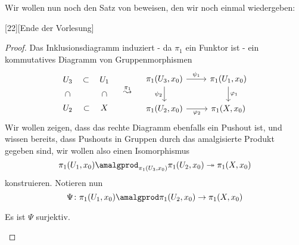Wir wollen nun noch den Satz von  beweisen, den wir noch einmal wiedergeben:

[22]{}[Ende der Vorlesung]


\begin{proof}
    Das Inklusionsdiagramm induziert - da $\pi_1$ ein Funktor ist - ein kommutatives Diagramm von Gruppenmorphismen
    \[
        \begin{tikzcd}[anchor=center]
        U_3 \ar[swap, phantom]{d}[rotate=-90]{\subset } \ar[phantom]{r}{\subset } & U_1 \ar[phantom]{d}[rotate=-90]{\subset } \\
        U_2 \ar[swap, phantom]{r}{\subset } & X
    \end{tikzcd}
    \quad \stackrel{\pi_1}{\leadsto} \quad
    \begin{tikzcd}[anchor=center]
        \pi_1( U_3 ,x_0)\ar[swap]{d}{\psi _2} \ar{r}{\psi _1} &\pi_1( U_1,x_0) \ar{d}{\varphi_1} \\
        \pi_1(U_2,x_0) \ar[swap]{r}{\varphi_2} & \pi_1(X,x_0)
    \end{tikzcd}
    \]
Wir wollen zeigen, dass das rechte Diagramm ebenfalls ein Pushout ist, und wissen bereits, dass Pushouts in Gruppen durch das amalgisierte Produkt gegeben sind, wir wollen also einen Isomorphismus
\[
    \pi_1(U_1,x_0) \amalgprod_{\pi_1(U_3,x_0)} \pi_1(U_2,x_0) \twoheadrightarrow \pi_1(X,x_0)
\] 
konstruieren. Notieren nun 
\[
    \Psi \colon \pi_1(U_1,x_0) \amalgprod \pi_1(U_2,x_0) \to \pi_1(X,x_0)
\] 


\begin{claim}
    Es ist $\Psi$ surjektiv.
\end{claim}
\begin{subproof}
    

\end{subproof}
\end{proof}
